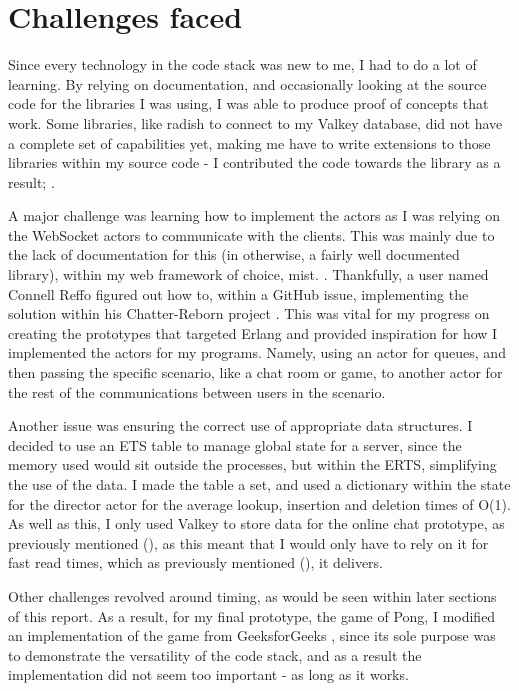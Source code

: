\documentclass[]{final}
\begin{document}
\section{Challenges faced}

Since every technology in the code stack was new to me, I had to do a lot of learning.
By relying on documentation, and occasionally looking at the source code for
the libraries I was using, I was able to produce proof of concepts that work.
Some libraries, like radish to connect to my Valkey database, did not have
a complete set of capabilities yet, making me have to write extensions to those
libraries within my source code - I contributed the code towards the
library as a result; \cite{noauthor_featfaeq:_nodate}.

A major challenge was learning how to implement the actors as I was relying on
the WebSocket actors to communicate with the clients. This was mainly due to the
lack of documentation for this (in otherwise, a fairly well documented library),
within my web framework of choice, mist. \cite{noauthor_example_nodate}.
Thankfully, a user named Connell Reffo figured out how to, within a GitHub issue,
implementing the solution within his Chatter-Reborn project \cite{reffo_connellr023/chatter-reborn_2024}.
This was vital for my progress on creating the prototypes that targeted Erlang and
provided inspiration for how I implemented the actors for my programs. Namely,
using an actor for queues, and then passing the specific scenario, like a chat
room or game, to another actor for the rest of the communications
between users in the scenario.

Another issue was ensuring the correct use of appropriate data structures.
I decided to use an ETS table to manage global state for a server, since the
memory used would sit outside the processes, but within the ERTS, simplifying
the use of the data. I made the table a set, and used a dictionary within the
state for the director actor for the average lookup, insertion and deletion
times of O(1). As well as this, I only used Valkey to store data for the
online chat prototype, as previously mentioned {\hypersetup{linkcolor=teal}(\pageref{valkeyMessageBroker})}, as this meant that I would
only have to rely on it for fast read times, which as previously mentioned {\hypersetup{linkcolor=teal}(\pageref{valkeyRead})},
it delivers.

Other challenges revolved around timing, as would be seen within later sections
of this report. As a result, for my final prototype, the game of Pong, I
modified an implementation of the game from GeeksforGeeks \cite{GeeksforGeeks_pong_2021}, since its sole
purpose was to demonstrate the versatility of the code stack, and as a result
the implementation did not seem too important - as long as it works.
\end{document}
